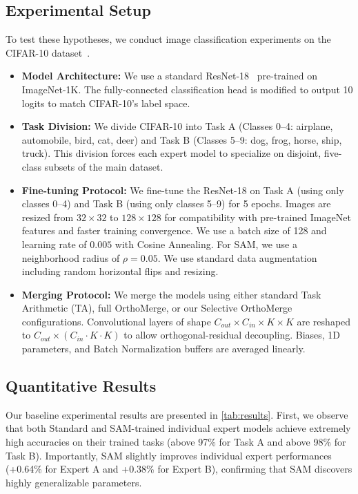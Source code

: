 \documentclass{article}
\begin{document}
\subsection{Experimental Setup}
To test these hypotheses, we conduct image classification experiments on the CIFAR-10 dataset~\cite{krizhevsky2009learning}.
\begin{itemize}
    \item \textbf{Model Architecture:} We use a standard ResNet-18~\cite{he2016deep} pre-trained on ImageNet-1K. The fully-connected classification head is modified to output 10 logits to match CIFAR-10's label space.
    \item \textbf{Task Division:} We divide CIFAR-10 into Task A (Classes 0--4: airplane, automobile, bird, cat, deer) and Task B (Classes 5--9: dog, frog, horse, ship, truck). This division forces each expert model to specialize on disjoint, five-class subsets of the main dataset.
    \item \textbf{Fine-tuning Protocol:} We fine-tune the ResNet-18 on Task A (using only classes 0--4) and Task B (using only classes 5--9) for 5 epochs. Images are resized from $32 \times 32$ to $128 \times 128$ for compatibility with pre-trained ImageNet features and faster training convergence. We use a batch size of 128 and learning rate of $0.005$ with Cosine Annealing. For SAM, we use a neighborhood radius of $\rho = 0.05$. We use standard data augmentation including random horizontal flips and resizing.
    \item \textbf{Merging Protocol:} We merge the models using either standard Task Arithmetic (TA), full OrthoMerge, or our Selective OrthoMerge configurations. Convolutional layers of shape $C_{out} \times C_{in} \times K \times K$ are reshaped to $C_{out} \times (C_{in} \cdot K \cdot K)$ to allow orthogonal-residual decoupling. Biases, 1D parameters, and Batch Normalization buffers are averaged linearly.
\end{itemize}

\subsection{Quantitative Results}
Our baseline experimental results are presented in \cref{tab:results}. 
First, we observe that both Standard and SAM-trained individual expert models achieve extremely high accuracies on their trained tasks (above 97\% for Task A and above 98\% for Task B). 
Importantly, SAM slightly improves individual expert performances (+0.64\% for Expert A and +0.38\% for Expert B), confirming that SAM discovers highly generalizable parameters.
\end{document}
